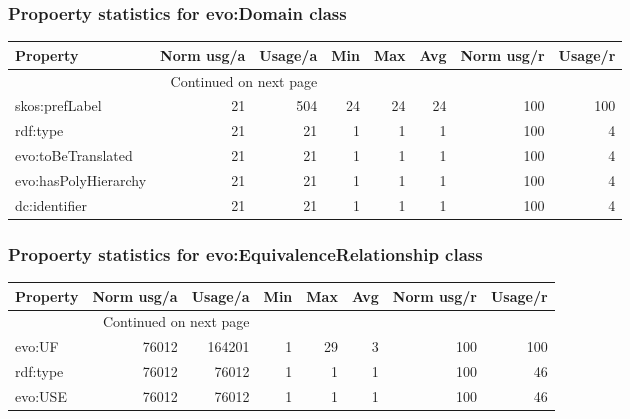 \documentclass[10pt,a4paper,titlepage,final]{article}
\begin{document}
\subsubsection{Propoerty statistics for evo:Domain class}
\begin{longtable}{lrrrrrrr}
\toprule
             Property &  Norm usg/a &  Usage/a &  Min &  Max &  Avg &  Norm usg/r &  Usage/r \\
\midrule
\endhead
\midrule
\multicolumn{3}{r}{{Continued on next page}} \\
\midrule
\endfoot

\bottomrule
\endlastfoot
       skos:prefLabel &          21 &      504 &   24 &   24 &   24 &         100 &      100 \\
             rdf:type &          21 &       21 &    1 &    1 &    1 &         100 &        4 \\
   evo:toBeTranslated &          21 &       21 &    1 &    1 &    1 &         100 &        4 \\
 evo:hasPolyHierarchy &          21 &       21 &    1 &    1 &    1 &         100 &        4 \\
        dc:identifier &          21 &       21 &    1 &    1 &    1 &         100 &        4 \\
\end{longtable}


\subsubsection{Propoerty statistics for evo:EquivalenceRelationship class}
\begin{longtable}{lrrrrrrr}
\toprule
 Property &  Norm usg/a &  Usage/a &  Min &  Max &  Avg &  Norm usg/r &  Usage/r \\
\midrule
\endhead
\midrule
\multicolumn{3}{r}{{Continued on next page}} \\
\midrule
\endfoot

\bottomrule
\endlastfoot
   evo:UF &       76012 &   164201 &    1 &   29 &    3 &         100 &      100 \\
 rdf:type &       76012 &    76012 &    1 &    1 &    1 &         100 &       46 \\
  evo:USE &       76012 &    76012 &    1 &    1 &    1 &         100 &       46 \\
\end{longtable}
\end{document}
